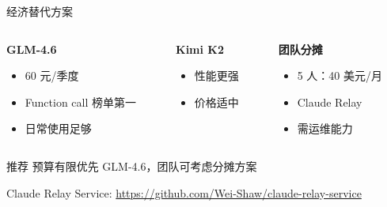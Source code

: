 \documentclass[aspectratio=169,xcolor=dvipsnames]{beamer}
\begin{document}
\begin{frame}{经济替代方案}
  \begin{columns}
    \begin{column}{0.32\textwidth}
      \textbf{GLM-4.6}
      \begin{itemize}
        \item 60 元/季度
        \item Function call 榜单第一
        \item 日常使用足够
      \end{itemize}
    \end{column}
    \begin{column}{0.32\textwidth}
      \textbf{Kimi K2}
      \begin{itemize}
        \item 性能更强
        \item 价格适中
      \end{itemize}
    \end{column}
    \begin{column}{0.32\textwidth}
      \textbf{团队分摊}
      \begin{itemize}
        \item 5 人：40 美元/月
        \item Claude Relay
        \item 需运维能力
      \end{itemize}
    \end{column}
  \end{columns}

  \vspace{0.5cm}

  \begin{exampleblock}{推荐}
    预算有限优先 GLM-4.6，团队可考虑分摊方案
  \end{exampleblock}

  \vspace{0.3cm}

  \small
  Claude Relay Service: \url{https://github.com/Wei-Shaw/claude-relay-service}
\end{frame}
\end{document}
